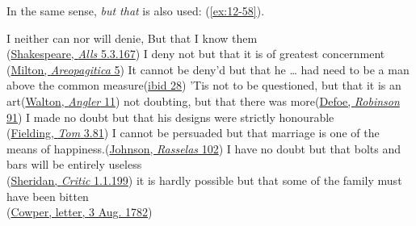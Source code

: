 In the same sense, \textit{but that} is also used: (\ref{ex:12-58}).

\ea \label{ex:12-58}
\ea
I neither can nor will denie, But that I know them\\\hfill(\href{https://internetshakespeare.uvic.ca/doc/AWW_F1/scene/5.3/index.html#tln-2885}{Shakespeare, \textit{Alls} 5.3.167})
\ex
I deny not but that it is of greatest concernment\\\hfill(\href{https://archive.org/details/areopagitica00miltuoft/page/4/mode/2up?q=%22deny+not+but+that%22&view=theater}{Milton, \textit{Areopagitica} 5}) %
\ex
It cannot be deny'd but that he {\dots} had need to be a man above the common measure\hfill(\href{https://archive.org/details/areopagitica00miltuoft/page/28/mode/2up?q=%22cannot+be+deny%27d%22&view=theater}{ibid 28})
\ex
'Tis not to be questioned, but that it is an art\hfill(\href{https://archive.org/details/complangler00waltrich/page/36/mode/2up?q=%22questioned+but%22&view=theater}{Walton, \textit{Angler} 11}) %
\ex
not doubting, but that there was more\hfill(\href{https://archive.org/details/lifeandstranges00dobsgoog/page/n117/mode/2up?q=%22doubting+but%22&view=theater}{Defoe, \textit{Robinson} 91}) %
\ex
I made no doubt but that his designs were strictly honourable\\\hfill(\href{https://archive.org/details/bim_eighteenth-century_the-history-of-tom-jones_fielding-henry_1749_3_0/page/80/mode/2up?q=%22made+no+doubt%22&view=theater}{Fielding, \textit{Tom} 3.81}) 
\ex
I cannot be persuaded but that marriage is one of the means of happiness.\hfill(\href{https://archive.org/details/historyrasselas01johngoog/page/n107/mode/2up?q=%22be+persuaded+but+that%22&view=theater}{Johnson, \textit{Rasselas} 102})
\ex
I have no doubt but that bolts and bars will be entirely useless\\\hfill(\href{https://archive.org/details/criticoratraged00aitkgoog/page/n38/mode/2up?q=%22have+no+doubt+but+that+bolts+and+bars%22&view=theater}{Sheridan, \textit{Critic} 1.1.199})
\ex
it is hardly possible but that some of the family must have been bitten\\\hfill(\href{https://www.gutenberg.org/cache/epub/47790/pg47790-images.html#Page_116}{Cowper, letter, 3 Aug. 1782})
